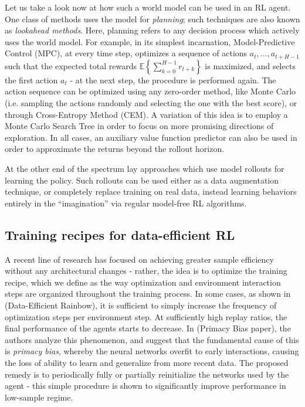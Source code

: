 \documentclass[twoside,11pt]{article}
\begin{document}
Let us take a look now at how such a world model can be used in an RL agent. One class of methods uses the model for \emph{planning}; such techniques are also known as \emph{lookahead methods}. Here, planning refers to any decision process which actively uses the world model. For example, in its simplest incarnation, Model-Predictive Control (MPC), at every time step, optimizes a sequence of actions $a_t, \ldots, a_{t+H-1}$ such that the expected total rewards $\mathbb{E}\left\{\sum_{k=0}^{H-1} r_{t+k} \right\}$ is maximized, and selects the first action $a_t$ - at the next step, the procedure is performed again. The action sequence can be optimized using any zero-order method, like Monte Carlo (i.e. sampling the actions randomly and selecting the one with the best score), or through Cross-Entropy Method (CEM). A variation of this idea is to employ a Monte Carlo Search Tree in order to focus on more promising directions of exploration. In all cases, an auxiliary value function predictor can also be used in order to approximate the returns beyond the rollout horizon.

At the other end of the spectrum lay approaches which use model rollouts for learning the policy. Such rollouts can be used either as a data augmentation technique, or completely replace training on real data, instead learning behaviors entirely in the ``imagination'' via regular model-free RL algorithms.

\subsection{Training recipes for data-efficient RL}\label{train_recipes}

A recent line of research has focused on achieving greater sample efficiency without any architectural changes - rather, the idea is to optimize the training recipe, which we define as the way optimization and environment interaction steps are organized throughout the training process. In some cases, as shown in (Data-Efficient Rainbow), it is sufficient to simply increase the frequency of optimization steps per environment step. At sufficiently high replay ratios, the final performance of the agents starts to decrease. In (Primacy Bias paper), the authors analyze this phenomenon, and suggest that the fundamental cause of this is \emph{primacy bias}, whereby the neural networks overfit to early interactions, causing the loss of ability to learn and generalize from more recent data. The proposed remedy is to periodically fully or partially reinitialize the networks used by the agent - this simple procedure is shown to significantly improve performance in low-sample regime.
\end{document}
